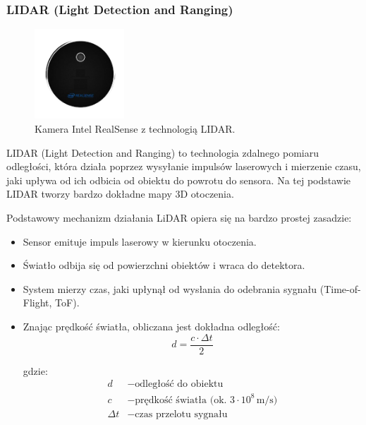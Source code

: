 \documentclass[magisterska]{pracadypl}
\begin{document}
\subsubsection*{LIDAR (Light Detection and Ranging)}

\begin{figure}[H]  %
    \centering  %
    \includegraphics[width=0.3\textwidth]{images/LIDAR.png}  %
    \captionsetup{font=footnotesize}
    \caption[Kamera Intel RealSense L515 z technologią LIDAR. https://cell-kom.com/inne/21454-kamera-internetowa-full-hd-b16-1080p-5900217390350.html]{Kamera Intel RealSense z technologią LIDAR.}
    \label{fig:mono}  %
\end{figure}

LIDAR (Light Detection and Ranging) to technologia zdalnego pomiaru odległości, która działa poprzez wysyłanie impulsów laserowych i mierzenie czasu, jaki upływa od ich odbicia od obiektu do powrotu do sensora. Na tej podstawie LIDAR tworzy bardzo dokładne mapy 3D otoczenia.

Podstawowy mechanizm działania LiDAR opiera się na bardzo prostej zasadzie:

\begin{itemize}
  \item Sensor emituje impuls laserowy w kierunku otoczenia.
  \item Światło odbija się od powierzchni obiektów i wraca do detektora.
  \item System mierzy czas, jaki upłynął od wysłania do odebrania sygnału (Time-of-Flight, ToF).
  \item Znając prędkość światła, obliczana jest dokładna odległość:
    \[
    d = \frac{c \cdot \Delta t}{2}
    \]

  gdzie:
  \begin{align*}
  d &- \text{odległość do obiektu} \\
  c &- \text{prędkość światła (ok. } 3 \cdot 10^8 \, \text{m/s)} \\
  \Delta t &- \text{czas przelotu sygnału}
  \end{align*} 
\end{itemize}
\end{document}

